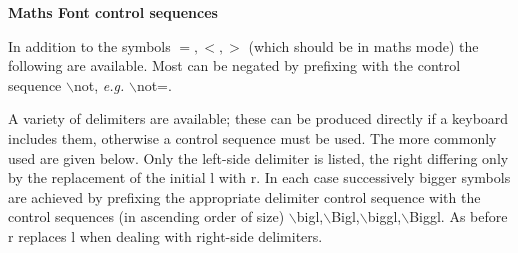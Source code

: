 {\bf  Maths Font control sequences}
\medskip



In addition to the symbols $=,<,>$ (which should be in maths mode)
the following are available. Most can be negated by prefixing
with the control sequence $\backslash$not, {\it e.g.} $\backslash$not=.


     

A variety of delimiters are available; these can be produced directly if
a keyboard includes them, otherwise a control sequence must be used.
The more commonly used are given below.
Only the left-side delimiter is listed, the right differing
only by the replacement of the initial l with r. In each case successively bigger
symbols are achieved by prefixing the appropriate delimiter control
sequence with the control sequences (in ascending order of size)
$\backslash$bigl,$\backslash$Bigl,$\backslash$biggl,$\backslash$Biggl. As before r replaces l when dealing with
right-side delimiters.


\line{~~~~~~$\backslash$lbrack                  \hfil\%  $[$~~~~~~}
\bye



